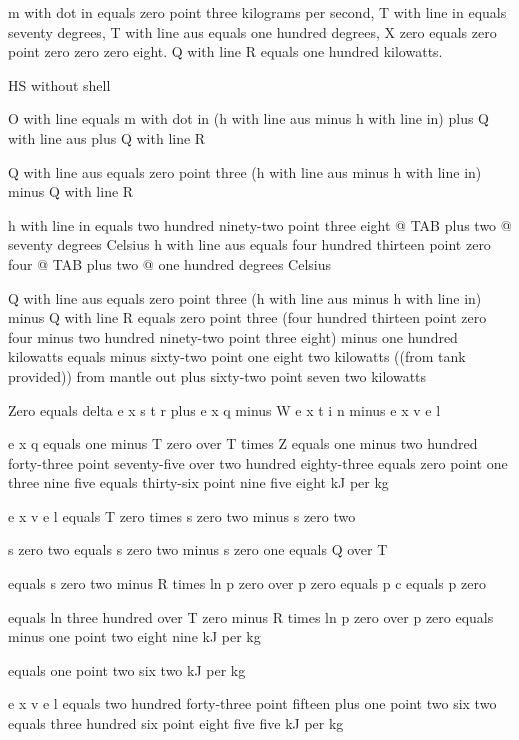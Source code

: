 m with dot in equals zero point three kilograms per second, T with line in equals seventy degrees, T with line aus equals one hundred degrees, X zero equals zero point zero zero zero eight. Q with line R equals one hundred kilowatts.

HS without shell

O with line equals m with dot in (h with line aus minus h with line in) plus Q with line aus plus Q with line R

Q with line aus equals zero point three (h with line aus minus h with line in) minus Q with line R

h with line in equals two hundred ninety-two point three eight @ TAB plus two @ seventy degrees Celsius
h with line aus equals four hundred thirteen point zero four @ TAB plus two @ one hundred degrees Celsius

Q with line aus equals zero point three (h with line aus minus h with line in) minus Q with line R
equals zero point three (four hundred thirteen point zero four minus two hundred ninety-two point three eight) minus one hundred kilowatts
equals minus sixty-two point one eight two kilowatts ((from tank provided))
from mantle out plus sixty-two point seven two kilowatts

Zero equals delta e x s t r plus e x q minus W e x t i n minus e x v e l

e x q equals one minus T zero over T times Z equals one minus two hundred forty-three point seventy-five over two hundred eighty-three equals zero point one three nine five equals thirty-six point nine five eight kJ per kg

e x v e l equals T zero times s zero two minus s zero two

s zero two equals s zero two minus s zero one equals Q over T

equals s zero two minus R times ln p zero over p zero equals p c equals p zero

equals ln three hundred over T zero minus R times ln p zero over p zero equals minus one point two eight nine kJ per kg

equals one point two six two kJ per kg

e x v e l equals two hundred forty-three point fifteen plus one point two six two equals three hundred six point eight five five kJ per kg